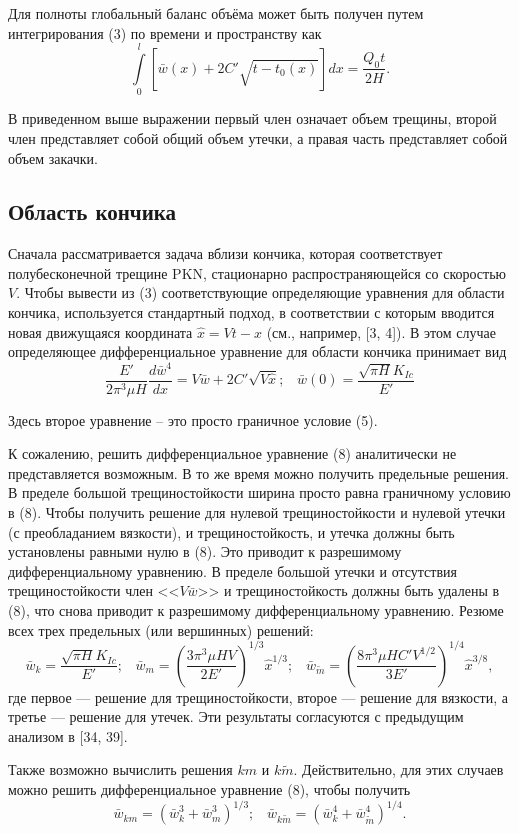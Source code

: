 \documentclass[a4paper, 12pt]{article}
\newcommand{\beq}{\begin{equation}}
\newcommand{\eeq}{\end{equation}}
\begin{document}
Для полноты глобальный баланс объёма может быть получен путем интегрирования (3) по времени и пространству как
\beq
\int\limits_{0}^{l}{\left[\bar{w}(x)+2C'\sqrt{t-t_0(x)}\right]dx}=\frac{Q_0t}{2H}.
\eeq

В приведенном выше выражении первый член означает объем трещины, второй член представляет собой общий объем утечки, а правая часть представляет собой объем закачки.

\subsection{Область кончика}

Сначала рассматривается задача вблизи кончика, которая соответствует полубесконечной трещине PKN, стационарно распространяющейся со скоростью $V$.
Чтобы вывести из (3) соответствующие определяющие уравнения для области кончика, используется стандартный подход, в соответствии с которым вводится новая движущаяся координата $\hat{x}=Vt-x$ (см., например, [3, 4]).
В этом случае определяющее дифференциальное уравнение для области кончика принимает вид
\beq
\frac{E'}{2\pi^3\mu H}\frac{d\bar{w}^4}{d\hat{x}}=V\bar{w}+2C'\sqrt{V\hat{x}};\,\,\,\,\,\bar{w}(0)=\frac{\sqrt{\pi H}K_{Ic}}{E'}
\eeq

Здесь второе уравнение -- это просто граничное условие (5).

К сожалению, решить дифференциальное уравнение (8) аналитически не представляется возможным.
В то же время можно получить предельные решения.
В пределе большой трещиностойкости ширина просто равна граничному условию в (8).
Чтобы получить решение для нулевой трещиностойкости и нулевой утечки (с преобладанием вязкости), и трещиностойкость, и утечка должны быть установлены равными нулю в (8).
Это приводит к разрешимому дифференциальному уравнению.
В пределе большой утечки и отсутствия трещиностойкости член <<$V\bar{w}$>> и трещиностойкость должны быть удалены в (8), что снова приводит к разрешимому дифференциальному уравнению.
Резюме всех трех предельных (или вершинных) решений:
\beq
\bar{w}_k=\frac{\sqrt{\pi H}K_{Ic}}{E'};\,\,\,\,\,
\bar{w}_m=\left(\frac{3\pi^3\mu HV}{2E'}\right)^{1/3}\hat{x}^{1/3};\,\,\,\,\,
\bar{w}_{\tilde{m}}=\left(\frac{8\pi^3\mu HC'V^{1/2}}{3E'}\right)^{1/4}\hat{x}^{3/8},
\eeq
где первое — решение для трещиностойкости, второе — решение для вязкости, а третье — решение для утечек.
Эти результаты согласуются с предыдущим анализом в [34, 39].

Также возможно вычислить решения $km$ и $k\tilde{m}$.
Действительно, для этих случаев можно решить дифференциальное уравнение (8), чтобы получить
\beq
\bar{w}_{km}=\left(\bar{w}_k^3+\bar{w}_m^3\right)^{1/3};\,\,\,\,\,
\bar{w}_{k\tilde{m}}=\left(\bar{w}_k^4+\bar{w}_{\tilde{m}}^4\right)^{1/4}.
\eeq
\end{document}
